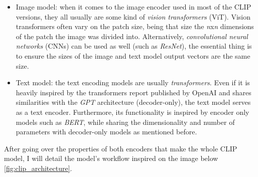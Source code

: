 \begin{itemize}
	\item Image model: when it comes to the image encoder used in most of the CLIP versions, they all usually are some kind of \textit{vision transformers} (ViT). Vision transformers often vary on the patch size, being that size the \textit{n}x\textit{n} dimensions of the patch the image was divided into. Alternatively, \textit{convolutional neural networks} (CNNs) can be used as well (such as \textit{ResNet}), the essential thing is to ensure the sizes of the image and text model output vectors are the same size. 
	
	\item Text model: the text encoding models are usually \textit{transformers}. Even if it is heavily inspired by the transformers report published by OpenAI \cite{radford2021learningtransferablevisualmodels} and shares similarities with the \textit{GPT} architecture (decoder-only), the text model serves as a text encoder. Furthermore, its functionality is inspired by encoder only models such as \textit{BERT}, while sharing the dimensionality and number of parameters with decoder-only models as mentioned before. 
\end{itemize}

After going over the properties of both encoders that make the whole CLIP model, I will detail the model's workflow inspired on the image below \ref{fig:clip_architecture}. 

